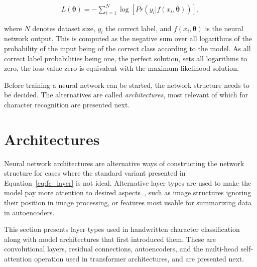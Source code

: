 \documentclass[english,twoside,openright]{UH_DS_MSc}
\begin{document}
\begin{align}
    L(\mathbf{\theta})=-\sum_{i=1}^{N}\log[Pr(y_i|f(x_i,\mathbf{\theta}))],
\end{align}

where $N$ denotes dataset size, $y_i$ the correct label, and $f(x_i, \mathbf{\theta})$ is the neural network output. This is computed as the negative sum over all logarithms of the probability of the input being of the correct class according to the model. As all correct label probabilities being one, the perfect solution, sets all logarithms to zero, the loss value zero is equivalent with the maximum likelihood solution.

Before training a neural network can be started, the network structure needs to be decided. The alternatives are called \textit{architectures}, most relevant of which for character recognition are presented next.

\section{Architectures}

Neural network architectures are alternative ways of constructing the network structure for cases where the standard variant presented in Equation~\ref{eq:fc_layer} is not ideal. Alternative layer types are used to make the model pay more attention to desired 
aspects~\cite{alexnet}, such as image structures ignoring their position in image processing, or features most usable for summarizing data in autoencoders.

This section presents layer types used in handwritten character classification 
along with model architectures that first introduced them.
These are convolutional layers, residual connections, autoencoders, and the multi-head self-attention operation used in transformer architectures, and are presented next.
\end{document}
